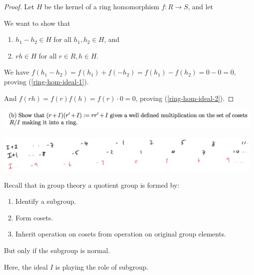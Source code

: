 \documentclass[12pt]{article}
\begin{document}
\begin{proof}
  Let $H$ be the kernel of a ring homomorphism $f:R \to S$, and let

  We want to show that
  \begin{enumerate}
  \item $h_1 - h_2 \in H$ for all $h_1, h_2 \in H$, and \label{ring-hom-ideal-1}
  \item $rh \in H$ for all $r \in R, h \in H$. \label{ring-hom-ideal-2}
  \end{enumerate}

  We have $f(h_1 - h_2) = f(h_1) + f(-h_2) = f(h_1) - f(h_2) = 0 - 0 = 0$, proving
  (\ref{ring-hom-ideal-1}).

  And $f(rh) = f(r)f(h) = f(r)\cdot 0 = 0$, proving (\ref{ring-hom-ideal-2}).

\end{proof}



\newpage
\begin{mdframed}
\includegraphics[width=400pt]{img/linear-algebra-a0-1-5-b.png}\\
\end{mdframed}

\begin{mdframed}
\includegraphics[width=400pt]{img/ideal-in-integers.png}
\end{mdframed}

\begin{mdframed}
\begin{remark*}
  Recall that in group theory a quotient group is formed by:
  \begin{enumerate}
  \item Identify a subgroup.
  \item Form cosets.
  \item Inherit operation on cosets from operation on original group elements.
  \end{enumerate}
  But only if the subgroup is normal.

  Here, the ideal $I$ is playing the role of subgroup.~\\
\end{remark*}
\end{mdframed}
\end{document}
